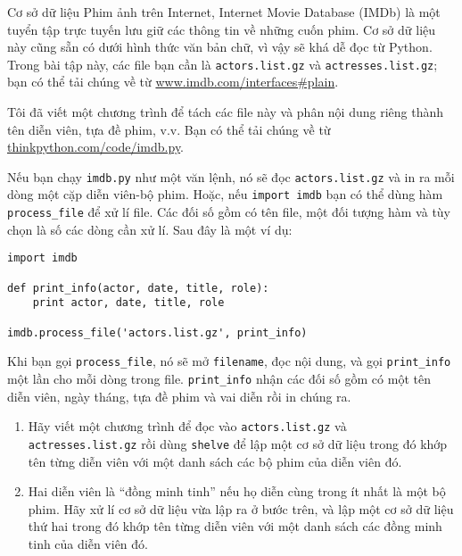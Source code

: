 \documentclass[11pt]{book}
\begin{document}
\begin{ex}


Cơ sở dữ liệu Phim ảnh trên Internet, Internet Movie Database (IMDb)
là một tuyển tập trực tuyến lưu giữ các thông tin về 
những cuốn phim. Cơ sở dữ liệu này cũng sẵn có dưới
hình thức văn bản chữ, vì vậy sẽ khá dễ đọc từ Python. 
Trong bài tập này, các file bạn cần là {\tt actors.list.gz}
và {\tt actresses.list.gz}; bạn có thể tải chúng về từ 
\url{www.imdb.com/interfaces#plain}.


Tôi đã viết một chương trình để tách các file này và 
phân nội dung riêng thành tên diễn viên, tựa đề phim, v.v. Bạn có thể
tải chúng về từ \url{thinkpython.com/code/imdb.py}.

Nếu bạn chạy {\tt imdb.py} như một văn lệnh, nó sẽ đọc {\tt actors.list.gz}
và in ra mỗi dòng một cặp diễn viên-bộ phim. Hoặc, nếu {\tt import
imdb} bạn có thể dùng hàm \verb"process_file" để 
xử lí file. Các đối số gồm có tên file, một đối tượng hàm và 
tùy chọn là số các dòng cần xử lí. Sau đây là một ví dụ:

\beforeverb
\begin{verbatim}
import imdb

def print_info(actor, date, title, role):
    print actor, date, title, role

imdb.process_file('actors.list.gz', print_info)
\end{verbatim}
\afterverb

Khi bạn gọi \verb"process_file", nó sẽ mở {\tt filename}, đọc 
nội dung, và gọi \verb"print_info" một lần cho mỗi dòng trong file.
\verb"print_info" nhận các đối số gồm có một tên diễn viên, 
ngày tháng, tựa đề phim và vai diễn rồi in chúng ra.

\begin{enumerate}

\item Hãy viết một chương trình để đọc vào {\tt actors.list.gz} và {\tt
  actresses.list.gz} rồi dùng {\tt shelve} để lập một cơ sở dữ liệu
  trong đó khớp tên từng diễn viên với một danh sách các bộ phim
  của diễn viên đó.
  

\item Hai diễn viên là ``đồng minh tinh'' nếu họ diễn cùng trong ít nhất
  là một bộ phim. Hãy xử lí cơ sở dữ liệu vừa lập ra ở bước trên, và
  lập một cơ sở dữ liệu thứ hai trong đó khớp tên từng diễn viên với
  một danh sách các đồng minh tinh của diễn viên đó.


\end{enumerate}
\end{ex}
\end{document}

